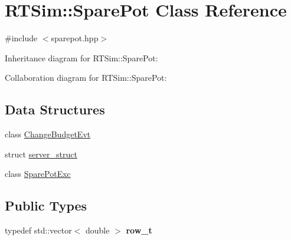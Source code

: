 \hypertarget{classRTSim_1_1SparePot}{}\section{R\+T\+Sim\+:\+:Spare\+Pot Class Reference}
\label{classRTSim_1_1SparePot}


{\ttfamily \#include $<$sparepot.\+hpp$>$}



Inheritance diagram for R\+T\+Sim\+:\+:Spare\+Pot\+:


Collaboration diagram for R\+T\+Sim\+:\+:Spare\+Pot\+:
\subsection*{Data Structures}
\begin{DoxyCompactItemize}
\item 
class \hyperlink{classRTSim_1_1SparePot_1_1ChangeBudgetEvt}{Change\+Budget\+Evt}
\item 
struct \hyperlink{structRTSim_1_1SparePot_1_1server__struct}{server\+\_\+struct}
\item 
class \hyperlink{classRTSim_1_1SparePot_1_1SparePotExc}{Spare\+Pot\+Exc}
\end{DoxyCompactItemize}
\subsection*{Public Types}
\begin{DoxyCompactItemize}
\item 
typedef std\+::vector$<$ double $>$ {\bfseries row\+\_\+t}\hypertarget{classRTSim_1_1SparePot_a3253ffa714d073a95c643b3d0ba1146f}{}\label{classRTSim_1_1SparePot_a3253ffa714d073a95c643b3d0ba1146f}

\end{DoxyCompactItemize}
